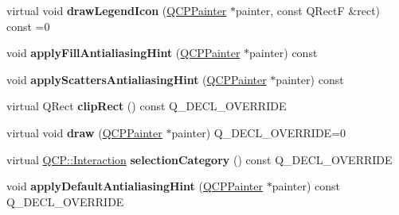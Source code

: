 \begin{DoxyCompactItemize}
\item 
virtual void {\bfseries draw\+Legend\+Icon} (\hyperlink{class_q_c_p_painter}{Q\+C\+P\+Painter} $\ast$painter, const Q\+RectF \&rect) const =0\hypertarget{class_q_c_p_abstract_plottable_a71c259f4f96533d12df152c446b17425}{}\label{class_q_c_p_abstract_plottable_a71c259f4f96533d12df152c446b17425}

\item 
void {\bfseries apply\+Fill\+Antialiasing\+Hint} (\hyperlink{class_q_c_p_painter}{Q\+C\+P\+Painter} $\ast$painter) const \hypertarget{class_q_c_p_abstract_plottable_ac08a480155895e674dbfe5a5670e0ff3}{}\label{class_q_c_p_abstract_plottable_ac08a480155895e674dbfe5a5670e0ff3}

\item 
void {\bfseries apply\+Scatters\+Antialiasing\+Hint} (\hyperlink{class_q_c_p_painter}{Q\+C\+P\+Painter} $\ast$painter) const \hypertarget{class_q_c_p_abstract_plottable_a753272ee225a62827e90c3e1e78de4b1}{}\label{class_q_c_p_abstract_plottable_a753272ee225a62827e90c3e1e78de4b1}

\item 
virtual Q\+Rect {\bfseries clip\+Rect} () const Q\+\_\+\+D\+E\+C\+L\+\_\+\+O\+V\+E\+R\+R\+I\+DE\hypertarget{class_q_c_p_abstract_plottable_ac4553dcece65e1ee5a86bacd235f3eb5}{}\label{class_q_c_p_abstract_plottable_ac4553dcece65e1ee5a86bacd235f3eb5}

\item 
virtual void {\bfseries draw} (\hyperlink{class_q_c_p_painter}{Q\+C\+P\+Painter} $\ast$painter) Q\+\_\+\+D\+E\+C\+L\+\_\+\+O\+V\+E\+R\+R\+I\+DE=0\hypertarget{class_q_c_p_abstract_plottable_a453f676a5cee7bf846c5f0fa05ea84b3}{}\label{class_q_c_p_abstract_plottable_a453f676a5cee7bf846c5f0fa05ea84b3}

\item 
virtual \hyperlink{namespace_q_c_p_a2ad6bb6281c7c2d593d4277b44c2b037}{Q\+C\+P\+::\+Interaction} {\bfseries selection\+Category} () const Q\+\_\+\+D\+E\+C\+L\+\_\+\+O\+V\+E\+R\+R\+I\+DE\hypertarget{class_q_c_p_abstract_plottable_ab90d413188d4ad5ab294bc35492a0e53}{}\label{class_q_c_p_abstract_plottable_ab90d413188d4ad5ab294bc35492a0e53}

\item 
void {\bfseries apply\+Default\+Antialiasing\+Hint} (\hyperlink{class_q_c_p_painter}{Q\+C\+P\+Painter} $\ast$painter) const Q\+\_\+\+D\+E\+C\+L\+\_\+\+O\+V\+E\+R\+R\+I\+DE\hypertarget{class_q_c_p_abstract_plottable_ac032077fb0db93d6faa3273d02363398}{}\label{class_q_c_p_abstract_plottable_ac032077fb0db93d6faa3273d02363398}


\end{DoxyCompactItemize}
